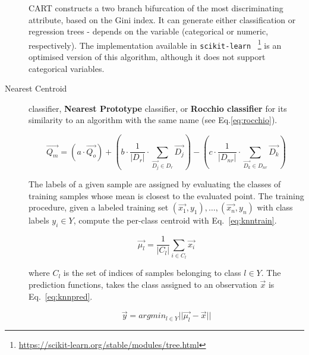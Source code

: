 \begin{description}
	CART constructs a two branch bifurcation of the most discriminating 
	attribute, based on the Gini index. It can generate either classification or 
	regression trees - depends on the variable (categorical or numeric, 
	respectively). The implementation available in 
	\texttt{scikit-learn}~\cite{scikit-learn}
	\footnote{\url{https://scikit-learn.org/stable/modules/tree.html}} is an 
	optimised version of this algorithm, although it does not support 
	categorical variables.
    
    \item [Nearest Centroid] classifier\cite{conformal2014},  \textbf{Nearest 
	Prototype} classifier, or \textbf{Rocchio classifier} for its similarity to 
	an algorithm with the same name (see Eq.\ref{eq:rocchio}). 
    
    \begin{equation}\label{eq:rocchio}
        \overrightarrow{Q_{m}} =  (a \cdot \overrightarrow{Q_{o}}) + (b \cdot 
        \frac{1}{\lvert D_{r} \rvert} \cdot \sum_{\overrightarrow{D_{j}} \in 
        D_{r}} \overrightarrow{D_{j}}) - (c \cdot \frac{1}{\lvert D_{nr} 
        \rvert} \cdot \sum_{\overrightarrow{D_{k}} \in D_{nr}} 
        \overrightarrow{D_{k}})
    \end{equation}
    
    The labels of a given sample are assigned by evaluating the classes of 
	training samples whose mean is closest to the evaluated point. The training 
	procedure, given a labeled training set ${(\overrightarrow{x_{1}}, y_{1}), 
	\ldots,  (\overrightarrow{x_{n}}, y_{n})}$ with class labels $y_{i} \in Y$, 
	compute the per-class centroid with Eq.~\ref{eq:knntrain}.
    
    \begin{equation}\label{eq:knntrain}
        \overrightarrow{\mu _{l}} = \frac{1}{\lvert C_{l} \rvert} \sum_{i \in 
        C_{l}} \overrightarrow{x_{i}}
    \end{equation}
    
    \noindent where $C_{l}$ is the set of indices of samples belonging to class 
	$l \in Y$.  The prediction functions, takes the class assigned to an 
	observation $\overrightarrow{x}$ is Eq.~\ref{eq:knnpred}.
    
    \begin{equation}\label{eq:knnpred}
        \overrightarrow{y} = argmin_{l \in Y} \lvert\lvert \overrightarrow{\mu _{l}} - \overrightarrow{x} \rvert\rvert
    \end{equation}

\end{description}

